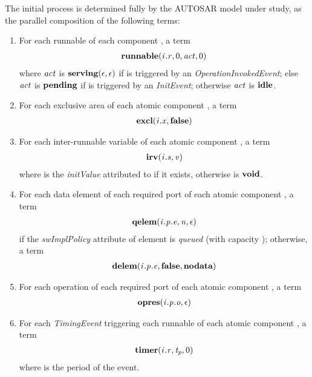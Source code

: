 \documentclass[twocolumn]{article}
\begin{document}
The initial process  is determined fully by the AUTOSAR model under study, as the parallel composition of the following terms:
\begin{enumerate}

\item For each runnable  of each component , a term
\[
\begin{array}{c}
  \Trunnable{\Tr{\V{R}}{\V{I}}}{0}{\Act}{0}
\end{array}
\]
where $\Act$ is $\textbf{serving}(\epsilon,\epsilon)$ if  is triggered by an \emph{OperationInvokedEvent}; else $\Act$ is $\textbf{pending}$ if  is triggered by an \emph{InitEvent}; otherwise $\Act$ is $\textbf{idle}$.

\item For each exclusive area  of each atomic component , a term
\[
\begin{array}{c}
  \Texcl{\Tx{\V{X}}{\V{I}}}{\Tfalse}
\end{array}
\]

\item For each inter-runnable variable  of each atomic component , a term
\[
\begin{array}{c}
  \Tirv{\Ts{\V{S}}{\V{I}}}{\V{V}}
\end{array}
\]
where  is the \emph{initValue} attributed to  if it exists, otherwise  is $\textbf{void}$.

\item For each data element  of each required port  of each atomic component , a term
\[
\begin{array}{c}
  \Tqelem{\Tep{\V{E}}{\V{P}}{\V{I}}}{\V{N}}{\epsilon}
\end{array}
\]
if the \emph{swImplPolicy} attribute of element  is \emph{queued} (with capacity ); otherwise, a term
\[
\begin{array}{c}
  \Tdelem{\Tep{\V{E}}{\V{P}}{\V{I}}}{\Tfalse}{\Tnodata}
\end{array}
\]

\item For each operation  of each required port  of each atomic component , a term
\[
\begin{array}{c}
  \Topres{\Tep{\V{O}}{\V{P}}{\V{I}}}{\epsilon}
\end{array}
\]

\item For each \emph{TimingEvent} triggering each runnable  of each atomic component , a term
\[
\begin{array}{c}
  \Ttimer{\Tr{\V{R}}{\V{I}}}{\V{T_p}}{0}
\end{array}
\]
where  is the period of the event.

\end{enumerate}
\end{document}

